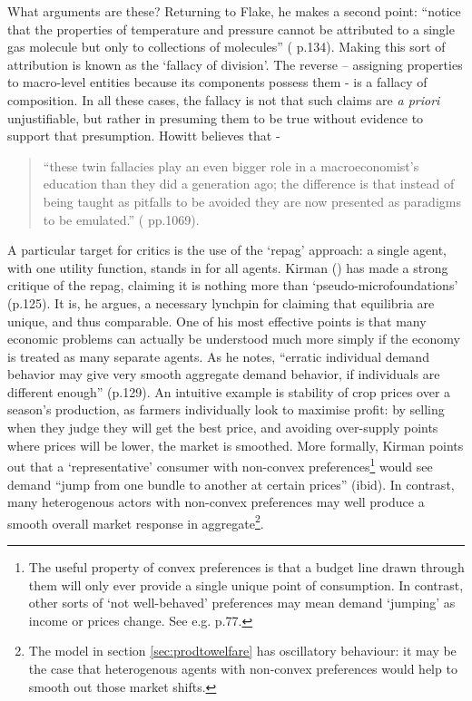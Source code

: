 What arguments are these? Returning to Flake, he makes a second point: ``notice that the properties of temperature and pressure cannot be attributed to a single gas molecule but only to collections of molecules'' (\citealt{flake_computational_1998} p.134). Making this sort of attribution is known as the `fallacy of division'. The reverse – assigning properties to macro-level entities because its components possess them - is a fallacy of composition. In all these cases, the fallacy is not that such claims are \emph{a priori} unjustifiable, but rather in presuming them to be true without evidence to support that presumption. Howitt believes that - 

\begin{quote}
``these twin fallacies play an even bigger role in a macroeconomist's education than they did a generation ago; the difference is that instead of being taught as pitfalls to be avoided they are now presented as paradigms to be emulated.'' (\citealt{howitt_coordination_2006} pp.1069).
\end{quote}

A particular target for critics is the use of the `\gls{repag}' approach: a single agent, with one utility function, stands in for all agents. Kirman (\citeyear{kirman_whom_1992}) has made a strong critique of the \gls{repag}, claiming it is nothing more than `pseudo-microfoundations' (p.125). It is, he argues, a necessary lynchpin for claiming that equilibria are unique, and thus comparable. One of his most effective points is that many economic problems can actually be understood much more simply if the economy is treated as many separate agents. As he notes, ``erratic individual demand behavior may give very smooth aggregate demand behavior, if individuals are different enough'' (p.129). An intuitive example is stability of crop prices over a season's production, as farmers individually look to maximise profit: by selling when they judge they will get the best price, and avoiding over-supply points where prices will be lower, the market is smoothed. More formally, Kirman points out that a `representative' consumer with non-convex preferences\footnote{The useful property of convex preferences is that a budget line drawn through them will only ever provide a single unique point of consumption. In contrast, other sorts of `not well-behaved' preferences may mean demand `jumping' as income or prices change. See e.g. \citealt{varian_intermediate_2006} p.77.} would see demand ``jump from one bundle to another at certain prices'' (ibid). In contrast, many heterogenous actors with non-convex preferences may well produce a smooth overall market response in aggregate\footnote{The model in section \ref{sec:prodtowelfare} has oscillatory behaviour: it may be the case that heterogenous agents with non-convex preferences would help to smooth out those market shifts.}. 

